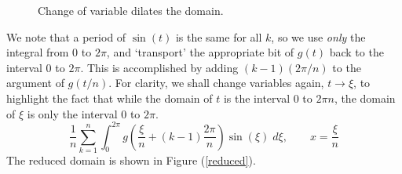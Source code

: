 \documentclass[12pt, a4paper, twoside, openright]{book}
\begin{document}
\begin{figure}[ht]
\centering
{}
\caption{Change of variable dilates the domain.}\label{dilate}
\end{figure}

We note that a period of $\sin(t)$ is the same for all $k$, so we use \emph{only} the integral from $0$ to $2\pi$, and `transport' the appropriate bit of $g(t)$ back to the interval $0$ to $2\pi$.  This is accomplished by adding $(k-1) (2\pi /n)$ to the argument of $g(t/n)$.  For clarity, we shall change variables again, $t \to \xi$, to highlight the fact that while the domain of $t$ is the interval $0$ to $2\pi n$, the domain of $\xi$ is only the interval $0$ to $2\pi$.
\begin{equation}
\frac{1}{n} \sum_{k=1}^n  \int_0^{2\pi} g\left(\frac{\xi}{n} + (k-1) \frac{2\pi}{n} \right) \sin(\xi) \;d\xi , \qquad x = \frac{\xi}{n}
\end{equation}
The reduced domain is shown in Figure (\ref{reduced}).
\end{document}
